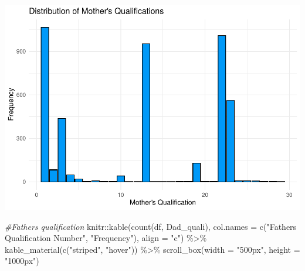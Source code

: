 \documentclass[
]{article}
\newenvironment{Shaded}{\begin{snugshade}}{\end{snugshade}}
\newcommand{\AttributeTok}[1]{\textcolor[rgb]{0.77,0.63,0.00}{#1}}
\newcommand{\CommentTok}[1]{\textcolor[rgb]{0.56,0.35,0.01}{\textit{#1}}}
\newcommand{\FunctionTok}[1]{\textcolor[rgb]{0.00,0.00,0.00}{#1}}
\newcommand{\NormalTok}[1]{#1}
\newcommand{\SpecialCharTok}[1]{\textcolor[rgb]{0.00,0.00,0.00}{#1}}
\newcommand{\StringTok}[1]{\textcolor[rgb]{0.31,0.60,0.02}{#1}}
\begin{document}
\includegraphics{midterm_files/figure-latex/unnamed-chunk-9-1.pdf}

\begin{Shaded}
\begin{Highlighting}[]
\CommentTok{\#Father\textquotesingle{}s qualification}
\NormalTok{knitr}\SpecialCharTok{::}\FunctionTok{kable}\NormalTok{(}\FunctionTok{count}\NormalTok{(df, }\StringTok{\textquotesingle{}Dad\_quali\textquotesingle{}}\NormalTok{), }\AttributeTok{col.names =} \FunctionTok{c}\NormalTok{(}\StringTok{"Father\textquotesingle{}s Qualification Number"}\NormalTok{, }\StringTok{"Frequency"}\NormalTok{), }\AttributeTok{align =} \StringTok{"c"}\NormalTok{) }\SpecialCharTok{\%\textgreater{}\%}
  \FunctionTok{kable\_material}\NormalTok{(}\FunctionTok{c}\NormalTok{(}\StringTok{"striped"}\NormalTok{, }\StringTok{"hover"}\NormalTok{)) }\SpecialCharTok{\%\textgreater{}\%} 
 \FunctionTok{scroll\_box}\NormalTok{(}\AttributeTok{width =} \StringTok{"500px"}\NormalTok{, }\AttributeTok{height =} \StringTok{"1000px"}\NormalTok{)}
\end{Highlighting}
\end{Shaded}
\end{document}
